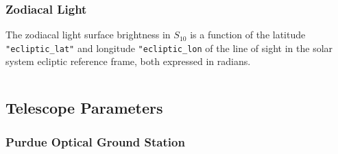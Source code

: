 \begin{listing}[H]
\inputminted[breaklines=true, breakanywhere=true, breaksymbol=\hspace{0pt}, fontsize=\footnotesize]{json}{/Users/liamrobinson/Documents/PyLightCurves/mirage/resources/data/moonlight.json}
\end{listing}

\subsubsection{Zodiacal Light} \label{data:roach_zod}

The zodiacal light surface brightness in $S_10$ is a function of the latitude \texttt{"ecliptic\_lat"} and longitude \texttt{"ecliptic\_lon} of the line of sight in the solar system ecliptic reference frame, both expressed in radians.

\begin{listing}[H]
\inputminted[breaklines=true, breakanywhere=true, breaksymbol=\hspace{0pt}, fontsize=\footnotesize]{json}{/Users/liamrobinson/Documents/PyLightCurves/mirage/resources/data/zodiacal.json}
\end{listing}

\subsection{Telescope Parameters}

\subsubsection{Purdue Optical Ground Station}

